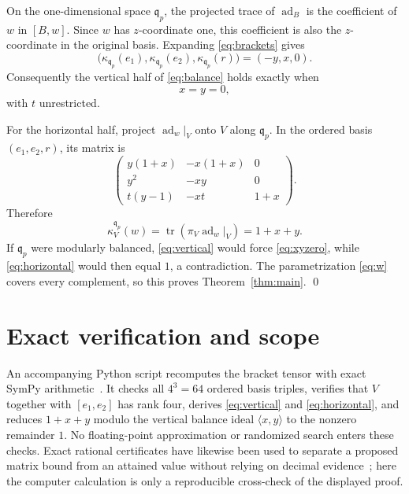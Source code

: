 \documentclass[11pt]{article}
\newcommand{\q}{\mathfrak{q}}
\newcommand{\ad}{\operatorname{ad}}
\newcommand{\tr}{\operatorname{tr}}
\begin{document}
On the one-dimensional space \(\q_p\), the projected trace of \(\ad_B\)
is the coefficient of \(w\) in \([B,w]\).  Since \(w\) has
\(z\)-coordinate one, this coefficient is also the \(z\)-coordinate in the
original basis.  Expanding \eqref{eq:brackets} gives
\begin{equation}\label{eq:vertical}
 \bigl(\kappa_{\q_p}(e_1),
       \kappa_{\q_p}(e_2),
       \kappa_{\q_p}(r)\bigr)=(-y,x,0).
\end{equation}
Consequently the vertical half of \eqref{eq:balance} holds exactly when
\begin{equation}\label{eq:xyzero}
 x=y=0,
\end{equation}
with \(t\) unrestricted.

For the horizontal half, project \(\ad_w|_V\) onto \(V\) along
\(\q_p\).  In the ordered basis \((e_1,e_2,r)\), its matrix is
\begin{equation}\label{eq:matrix}
 \begin{pmatrix}
 y(1+x) & -x(1+x) & 0\\
 y^2 & -xy & 0\\
 t(y-1) & -xt & 1+x
 \end{pmatrix}.
\end{equation}
Therefore
\begin{equation}\label{eq:horizontal}
 \kappa_V^{\q_p}(w)
 =\tr\!\left(\pi_V\ad_w|_V\right)
 =1+x+y.
\end{equation}
If \(\q_p\) were modularly balanced, \eqref{eq:vertical} would force
\eqref{eq:xyzero}, while \eqref{eq:horizontal} would then equal \(1\), a
contradiction.  The parametrization \eqref{eq:w} covers every complement,
so this proves Theorem~\ref{thm:main}. \qed

\section{Exact verification and scope}

An accompanying Python script recomputes the bracket tensor with exact
SymPy arithmetic~\cite{MeurerEtAl2017}.  It checks all \(4^3=64\) ordered
basis triples, verifies that \(V\) together with \([e_1,e_2]\) has rank
four, derives \eqref{eq:vertical} and \eqref{eq:horizontal}, and reduces
\(1+x+y\) modulo the vertical balance ideal \(\langle x,y\rangle\) to the
nonzero remainder \(1\).  No floating-point approximation or randomized
search enters these checks.  Exact rational certificates have likewise
been used to separate a proposed matrix bound from an attained value without
relying on decimal evidence~\cite{ZengLiuRatnavelu2026}; here the
computer calculation is only a reproducible cross-check of the displayed
proof.
\end{document}
